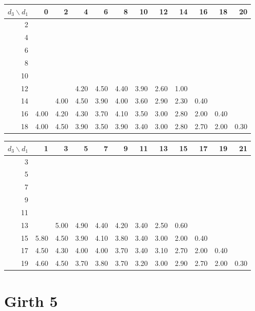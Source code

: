 \begin{tabular}{r|rrrrrrrrrrr}
\hline
$d_3 \backslash d_1$ & 0 & 2 & 4 & 6 & 8 & 10 & 12 & 14 & 16 & 18 & 20 \\
\hline
2 &  &  &  &  &  &  &  &  &  &  &  \\
4 &  &  &  &  &  &  &  &  &  &  &  \\
6 &  &  &  &  &  &  &  &  &  &  &  \\
8 &  &  &  &  &  &  &  &  &  &  &  \\
10 &  &  &  &  &  &  &  &  &  &  &  \\
12 &  &  & 4.20 & 4.50 & 4.40 & 3.90 & 2.60 & 1.00 &  &  &  \\
14 &  & 4.00 & 4.50 & 3.90 & 4.00 & 3.60 & 2.90 & 2.30 & 0.40 &  &  \\
16 & 4.00 & 4.20 & 4.30 & 3.70 & 4.10 & 3.50 & 3.00 & 2.80 & 2.00 & 0.40 &  \\
18 & 4.00 & 4.50 & 3.90 & 3.50 & 3.90 & 3.40 & 3.00 & 2.80 & 2.70 & 2.00 & 0.30 \\
\hline
\end{tabular}

\begin{tabular}{r|rrrrrrrrrrr}
\hline
$d_3 \backslash d_1$ & 1 & 3 & 5 & 7 & 9 & 11 & 13 & 15 & 17 & 19 & 21 \\
\hline
3 &  &  &  &  &  &  &  &  &  &  &  \\
5 &  &  &  &  &  &  &  &  &  &  &  \\
7 &  &  &  &  &  &  &  &  &  &  &  \\
9 &  &  &  &  &  &  &  &  &  &  &  \\
11 &  &  &  &  &  &  &  &  &  &  &  \\
13 &  & 5.00 & 4.90 & 4.40 & 4.20 & 3.40 & 2.50 & 0.60 &  &  &  \\
15 & 5.80 & 4.50 & 3.90 & 4.10 & 3.80 & 3.40 & 3.00 & 2.00 & 0.40 &  &  \\
17 & 4.50 & 4.30 & 4.00 & 4.00 & 3.70 & 3.40 & 3.10 & 2.70 & 2.00 & 0.40 &  \\
19 & 4.60 & 4.50 & 3.70 & 3.80 & 3.70 & 3.20 & 3.00 & 2.90 & 2.70 & 2.00 & 0.30 \\
\hline
\end{tabular}

\section*{Girth 5}

